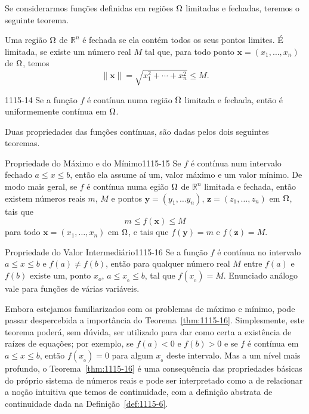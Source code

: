 Se considerarmos funções definidas em regiões $\Omega$ limitadas e fechadas, teremos o 
seguinte teorema.
\begin{obs}
Uma região $\Omega$ de $\mathbb{R}^n$ é fechada se ela contém todos os seus pontos 
limites. É limitada, se existe um número real $M$ tal que, para todo
 ponto $\mathbf{x} = (x_1,\ldots,  x_n)$ de $\Omega$, temos
\begin{equation*}
\|\mathbf{x}\|=\sqrt{x_1^2+\cdots+x_n^2} \leq M.
\end{equation*}
\end{obs}

\begin{theoc}{}{1115-14} 
Se a função $f$ é contínua numa região $\Omega$ limitada e fechada, então é uniformemente
contínua em $\Omega$.
\end{theoc}

Duas propriedades das funções contínuas, são dadas pelos dois seguintes teoremas.

\begin{theoc}{Propriedade do Máximo e do Mínimo}{1115-15}
Se $f$ é contínua num intervalo fechado $a \le x \le b$, então ela assume aí um, valor máximo e um valor mínimo. De modo mais geral, se $f$ é contínua numa 
egião $\Omega$ de $\mathbb{R}^n$ limitada e fechada, então existem números reais $m$, $M$ e pontos $\mathbf{y}=(y_1,\ldots y_n)$, $\mathbf{z} = (z_1,\ldots, z_n)$ em $\Omega$, tais que
\begin{equation*}
  m \le f(\mathbf{x}) \le M
\end{equation*}
para todo $\mathbf{x} = (x_1,\ldots,x_n)$ em $\Omega$, e tais que $f(\mathbf{y}) = m$ e $f(\mathbf{z})=M$.
\end{theoc}

\begin{theoc}{Propriedade do Valor Intermediário}{1115-16}
Se a função $f$ é contínua no intervalo $a \le x \le b$ e $f(a)\neq f(b)$, então para qualquer número 
real $M$ entre $f(a)$ e $f(b)$ existe um, ponto $x_o$, $a \le x_{_{0}} \le b$, tal 
que $f(x_{_{0}}) = M$. Enunciado análogo vale para funções de várias variáveis.
\end{theoc}

Embora estejamos familiarizados com os problemas de máximo e mínimo, pode passar despercebida a 
importância do Teorema~\ref{thm:1115-16}. Simplesmente, este teorema poderá, sem dúvida, ser 
utilizado para dar como certa a existência de raízes de equações; por exemplo, 
se $f(a) < 0$ e $f(b) > 0$ e se $f$ é contínua em $a \le x \le b$, então $f(x_{_{0}}) = 0$ 
para algum $x_{_{0}}$ deste intervalo. Mas a um nível mais profundo, o Teorema~\ref{thm:1115-16} 
é uma consequência das propriedades básicas do próprio sistema de números reais e pode ser 
interpretado como a de relacionar a noção intuitiva que temos de continuidade, com a definição
 abstrata de continuidade dada na Definição~\ref{def:1115-6}.

